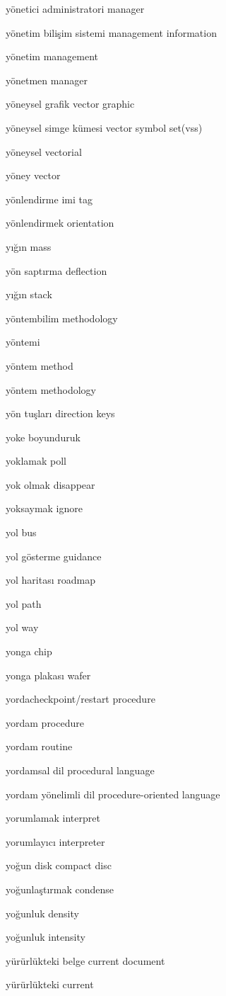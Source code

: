 \documentclass[12pt,fleqn]{article}\usepackage{../../common}
\begin{document}
yönetici administratori manager

yönetim bilişim sistemi management information

yönetim management

yönetmen manager

yöneysel grafik vector graphic

yöneysel simge kümesi vector symbol set(vss)

yöneysel vectorial

yöney vector

yönlendirme imi tag

yönlendirmek orientation

yığın mass

yön saptırma deflection

yığın stack

yöntembilim methodology

yöntemi

yöntem method

yöntem methodology

yön tuşları direction keys

yoke boyunduruk

yoklamak poll

yok olmak disappear

yoksaymak ignore

yol bus

yol gösterme guidance

yol haritası roadmap

yol path

yol way

yonga chip

yonga plakası wafer

yordacheckpoint/restart procedure

yordam procedure

yordam routine

yordamsal dil procedural language

yordam yönelimli dil procedure-oriented language

yorumlamak interpret

yorumlayıcı interpreter

yoğun disk compact disc

yoğunlaştırmak condense

yoğunluk density

yoğunluk intensity

yürürlükteki belge current document

yürürlükteki current
\end{document}
